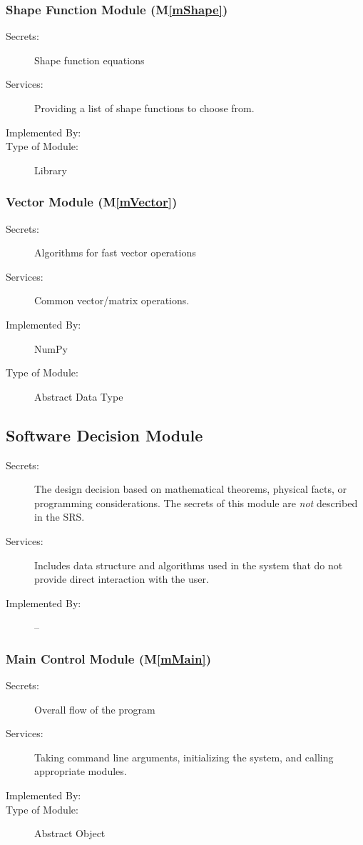 \documentclass[12pt, titlepage]{article}
\newcommand{\mref}[1]{M\ref{#1}}
\begin{document}
\subsubsection{Shape Function Module (\mref{mShape})}
\begin{description}
\item[Secrets:]Shape function equations
\item[Services:]Providing a list of shape functions to choose from.
\item[Implemented By:] \progname{}
\item[Type of Module:] Library
\end{description}

\subsubsection{Vector Module (\mref{mVector})}
\begin{description}
\item[Secrets:]Algorithms for fast vector operations
\item[Services:]Common vector/matrix operations.
\item[Implemented By:] NumPy
\item[Type of Module:] Abstract Data Type
\end{description}


\subsection{Software Decision Module}

\begin{description}
\item[Secrets:] The design decision based on mathematical theorems, physical
  facts, or programming considerations. The secrets of this module are
  \emph{not} described in the SRS.
\item[Services:] Includes data structure and algorithms used in the system that
  do not provide direct interaction with the user. 
\item[Implemented By:] --
\end{description}

\subsubsection{Main Control Module (\mref{mMain})}
\begin{description}
\item[Secrets:]Overall flow of the program
\item[Services:]Taking command line arguments, initializing the system, and calling appropriate modules.
\item[Implemented By:] \progname{}
\item[Type of Module:] Abstract Object
\end{description}
\end{document}

